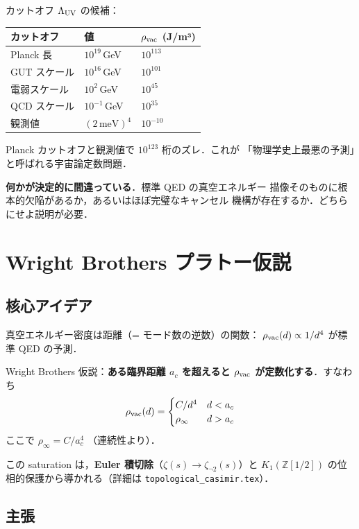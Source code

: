 \documentclass[11pt,a4paper]{article}
\begin{document}
カットオフ $\Lambda_{\rm UV}$ の候補：
\begin{center}
\begin{tabular}{lll}
\toprule
カットオフ & 値 & $\rho_{\rm vac}$ (J/m³) \\
\midrule
Planck 長 & $10^{19}$\,GeV & $10^{113}$ \\
GUT スケール & $10^{16}$\,GeV & $10^{101}$ \\
電弱スケール & $10^{2}$\,GeV & $10^{45}$ \\
QCD スケール & $10^{-1}$\,GeV & $10^{35}$ \\
観測値 & $(2\,\text{meV})^4$ & $10^{-10}$ \\
\bottomrule
\end{tabular}
\end{center}

Planck カットオフと観測値で $\boxed{10^{123}}$ 桁のズレ．これが
「物理学史上最悪の予測」と呼ばれる宇宙論定数問題．

\textbf{何かが決定的に間違っている}．標準 QED の真空エネルギー
描像そのものに根本的欠陥があるか，あるいはほぼ完璧なキャンセル
機構が存在するか．どちらにせよ説明が必要．

\section{Wright Brothers プラトー仮説}

\subsection{核心アイデア}

真空エネルギー密度は距離（= モード数の逆数）の関数：
$\rho_{\rm vac}(d) \propto 1/d^4$ が標準 QED の予測．

Wright Brothers 仮説：\textbf{ある臨界距離 $a_c$ を超えると
$\rho_{\rm vac}$ が定数化する}．すなわち
\begin{equation}
\rho_{\rm vac}(d) = \begin{cases}
C/d^4 & d < a_c \\
\rho_\infty & d > a_c
\end{cases}
\end{equation}
ここで $\rho_\infty = C/a_c^4$ （連続性より）．

この saturation は，\textbf{Euler 積切除}（$\zeta(s) \to \zeta_{\neg 2}(s)$）と
$K_1(\mathbb Z[1/2])$ の位相的保護から導かれる（詳細は
\texttt{topological\_casimir.tex}）．

\subsection{主張}
\end{document}
